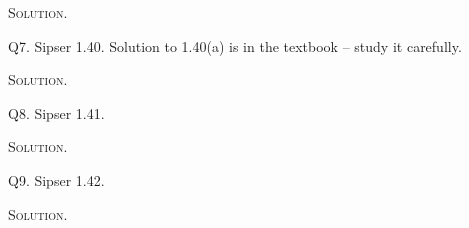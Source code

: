 \textsc{Solution}.



\newpage
Q7. Sipser 1.40. Solution to 1.40(a) is in the textbook -- study it carefully.

\textsc{Solution}.



\newpage
Q8. Sipser 1.41.

\textsc{Solution}.



\newpage
Q9. Sipser 1.42.

\textsc{Solution}.




